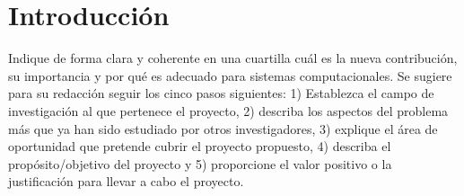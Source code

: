 \section{Introducción}
Indique de forma clara y coherente en una cuartilla cuál es la nueva contribución, su importancia y por qué es adecuado para sistemas computacionales. 
Se sugiere para su redacción seguir los cinco pasos siguientes: 1) Establezca el campo de investigación al que pertenece el proyecto, 2) describa 
los aspectos del problema más que ya han sido estudiado por otros investigadores, 3) explique el área de oportunidad que pretende cubrir el proyecto 
propuesto, 4) describa el propósito/objetivo del proyecto y 5) proporcione el valor positivo o la justificación para llevar a cabo el proyecto.
